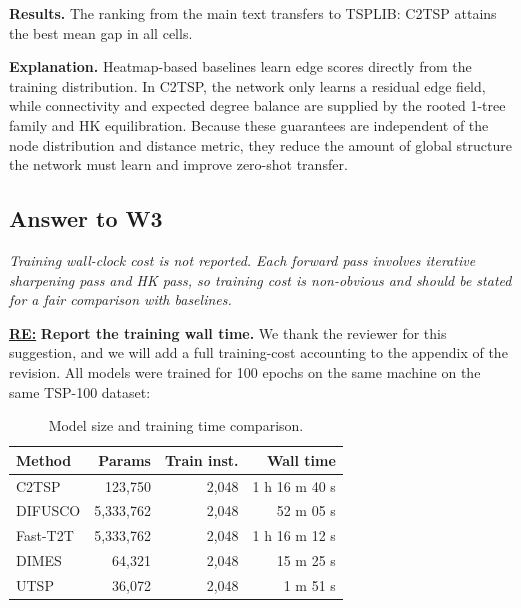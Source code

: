 \textbf{Results.}
The ranking from the main text transfers to TSPLIB: C2TSP attains the best mean gap in all cells.

\textbf{Explanation.}
Heatmap-based baselines learn edge scores directly from the training distribution. In C2TSP, the network only learns a residual edge field, while connectivity and expected degree balance are supplied by the rooted 1-tree family and HK equilibration. Because these guarantees are independent of the node distribution and distance metric, they reduce the amount of global structure the network must learn and improve zero-shot transfer.

\subsection{Answer to W3}

\textit{Training wall-clock cost is not reported. Each forward pass involves iterative sharpening pass and HK pass, so training cost is non-obvious and should be stated for a fair comparison with baselines.}

\textbf{\underline{RE:}}
\textbf{Report the training wall time.}
We thank the reviewer for this suggestion, and we will add a full training-cost accounting to the appendix of the revision. All models were trained for 100 epochs on the same machine on the same TSP-100 dataset:

\begin{table}[h]
\centering
\small
\caption{Model size and training time comparison.}
\label{tab:model_size}
\begin{tabular}{lrrr}
\toprule
Method & Params & Train inst. & Wall time \\
\midrule
C2TSP    & 123,750   & 2,048 & 1 h 16 m 40 s \\
DIFUSCO  & 5,333,762 & 2,048 & 52 m 05 s \\
Fast-T2T & 5,333,762 & 2,048 & 1 h 16 m 12 s \\
DIMES    & 64,321    & 2,048 & 15 m 25 s \\
UTSP     & 36,072    & 2,048 & 1 m 51 s \\
\bottomrule
\end{tabular}
\end{table}

